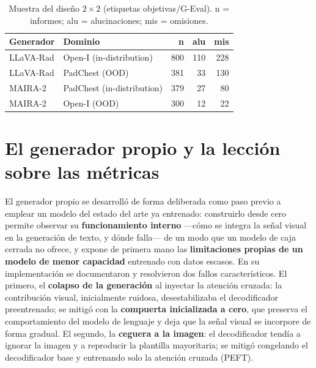 \begin{table}[t]\centering
\caption{Muestra del diseño \(2\times2\) (etiquetas objetivas/G-Eval). n = informes; alu = alucinaciones; mis = omisiones.}
\label{tab:muestra}
\begin{tabular}{llrrr}
\toprule
Generador & Dominio & n & alu & mis \\ \midrule
LLaVA-Rad & Open-I (in-distribution)  & 800 & 110 & 228 \\
LLaVA-Rad & PadChest (OOD)            & 381 & 33  & 130 \\
MAIRA-2   & PadChest (in-distribution)& 379 & 27  & 80  \\
MAIRA-2   & Open-I (OOD)              & 300 & 12  & 22  \\ \bottomrule
\end{tabular}
\end{table}

\section{El generador propio y la lección sobre las métricas}
El generador propio se desarrolló de forma deliberada como paso previo a emplear un modelo del
estado del arte ya entrenado: construirlo desde cero permite observar su \textbf{funcionamiento
interno} —cómo se integra la señal visual en la generación de texto, y dónde falla— de un modo que
un modelo de caja cerrada no ofrece, y expone de primera mano las \textbf{limitaciones propias de un
modelo de menor capacidad} entrenado con datos escasos. En su implementación se documentaron y
resolvieron dos fallos característicos. El primero, el \textbf{colapso de la generación} al inyectar la atención
cruzada: la contribución visual, inicialmente ruidosa, desestabilizaba el decodificador preentrenado;
se mitigó con la \textbf{compuerta inicializada a cero}, que preserva el comportamiento del modelo de
lenguaje y deja que la señal visual se incorpore de forma gradual. El segundo, la \textbf{ceguera a la
imagen}: el decodificador tendía a ignorar la imagen y a reproducir la plantilla mayoritaria; se
mitigó congelando el decodificador base y entrenando solo la atención cruzada (PEFT).

